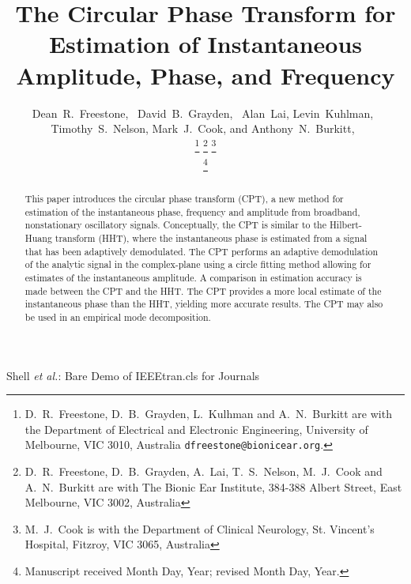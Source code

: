 \documentclass[a4paper]{IEEEtran}
\begin{document}
\title{The Circular Phase Transform for Estimation of Instantaneous Amplitude, Phase, and Frequency}

\author{Dean~R.~Freestone,~
		David~B.~Grayden,~
        Alan~Lai,
        Levin~Kuhlman,~
        Timothy~S.~Nelson,
        Mark~J.~Cook,
        and Anthony~N.~Burkitt,~
        

\thanks{D.\ R.\ Freestone, D.\ B.\ Grayden, L.\ Kulhman and A.\ N.\ Burkitt are with the Department
of Electrical and Electronic Engineering, University of Melbourne, VIC 3010, Australia {\tt\small dfreestone@bionicear.org}.}  %
\thanks{D.\ R.\ Freestone, D.\ B.\ Grayden, A.\ Lai, T.\ S.\ Nelson, M.\ J.\ Cook and A.\ N.\ Burkitt are with The Bionic Ear Institute, 384-388 Albert Street, East Melbourne, VIC 3002, Australia}
\thanks{M.\ J.\ Cook is with the Department of Clinical Neurology, St. Vincent's Hospital, Fitzroy, VIC 3065, Australia}

\thanks{Manuscript received Month Day, Year; revised Month Day, Year.}}


%
{Shell \MakeLowercase{\textit{et al.}}: Bare Demo of IEEEtran.cls for Journals}

\maketitle

\begin{abstract}
This paper introduces the circular phase transform (CPT), a new method for estimation of the instantaneous phase, frequency and amplitude from broadband, nonstationary oscillatory signals. Conceptually, the CPT is similar to the Hilbert-Huang transform (HHT), where the instantaneous phase is estimated from a signal that has been adaptively demodulated. The CPT performs an adaptive demodulation of the analytic signal in the complex-plane using a circle fitting method allowing for estimates of the instantaneous amplitude. A comparison in estimation accuracy is made between the CPT and the HHT. The CPT provides a more local estimate of the instantaneous phase than the HHT, yielding more accurate results. The CPT may also be used in an empirical mode decomposition.
\end{abstract}
\end{document}
